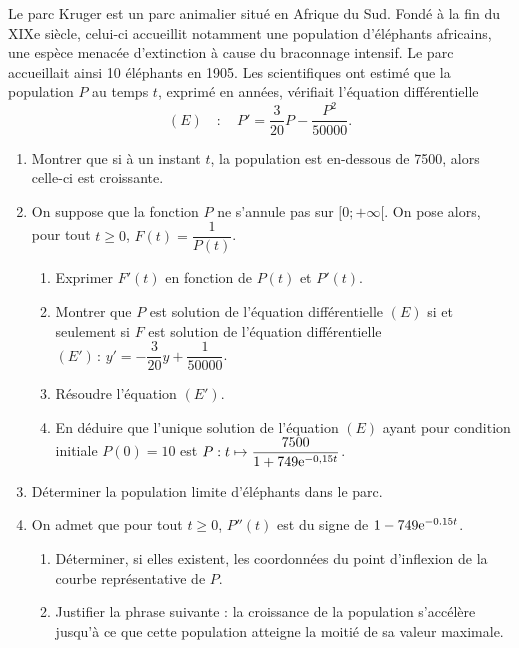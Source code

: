 \documentclass[11pt,fleqn, openany]{book} %
\begin{document}
\begin{exercise}[subtitle={(Modèle de Verhulst)}]Le parc Kruger est un parc animalier situé en Afrique du Sud. Fondé à la fin du XIXe siècle, celui-ci accueillit notamment une population d'éléphants africains, une espèce menacée d'extinction à cause du braconnage intensif. 
Le parc accueillait ainsi 10 éléphants en 1905. Les scientifiques ont estimé que la population $P$ au temps $t$, exprimé en années, vérifiait l'équation différentielle
\[(E) \quad : \quad P' = \dfrac{3}{20}P - \dfrac{P^2}{50000}.\]

\begin{enumerate}
\item Montrer que si à un instant $t$, la population est en-dessous de 7500, alors celle-ci est croissante.
\item On suppose que la fonction $P$ ne s'annule pas sur $[0;+\infty [$. On pose alors, pour tout $t\geqslant 0$, $F(t)=\dfrac{1}{P(t)}$.
\begin{enumerate}
\item Exprimer $F'(t)$ en fonction de $P(t)$ et $P'(t)$.
\item Montrer que $P$ est solution de l'équation différentielle $(E)$ si et seulement si $F$ est solution de l'équation différentielle $(E') \, : \, y'=-\dfrac{3}{20}y + \dfrac{1}{50000}$.
\item Résoudre l'équation $(E')$.
\item En déduire que l'unique solution de l'équation $(E)$ ayant pour condition initiale $P(0)=10$ est $P : t \mapsto \dfrac{7500}{1+749\mathrm{e}^{-0,15t}}$.
\end{enumerate}
\item Déterminer la population limite d'éléphants dans le parc.
\item On admet que pour tout $t \geqslant 0$, $P''(t)$ est du signe de $1-749\mathrm{e}^{-0.15t}$. 
\begin{enumerate}
\item Déterminer, si elles existent, les coordonnées du point d'inflexion de la courbe représentative de $P$.
\item Justifier la phrase suivante : la croissance de la population s'accélère jusqu'à ce que cette population atteigne la moitié de sa valeur maximale.
\end{enumerate}
\end{enumerate}\newpage \end{exercise}
\end{document}
